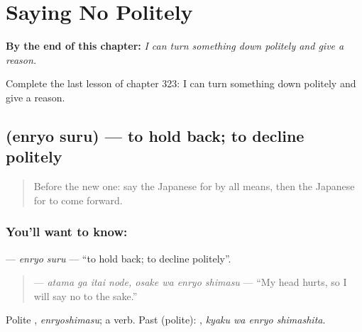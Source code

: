 
\chapter{Saying No Politely}
\label{ch:ja-saying-no-politely}

\begin{chapteropening}
\textbf{By the end of this chapter:} \emph{I can turn something down politely and give a reason.}

Complete the last lesson of chapter 323: I can turn something down politely and give a reason.
\end{chapteropening}

\section[\texorpdfstring{\ja{えんりょする} (enryo suru)}{えんりょする (enryo suru)}]{ (enryo suru) — to hold back; to decline politely}

\label{lesson:JA-C323-enryo-suru}



\begin{quote}
Before the new one: say the Japanese for by all means, then the Japanese for to come forward.
\end{quote}

\subsection*{You'll want to know: }
\textbf{} — \emph{enryo suru} — \textquotedblleft{}to hold back; to decline politely\textquotedblright{}.

\begin{quote}
\textbf{  } — \emph{atama ga itai node, osake wa enryo shimasu} — \textquotedblleft{}My head hurts, so I will say no to the sake.\textquotedblright{}
\end{quote}

Polite \textbf{}, \emph{enryoshimasu}; a  verb. Past (polite): \textbf{ }, \emph{kyaku wa enryo shimashita}.

